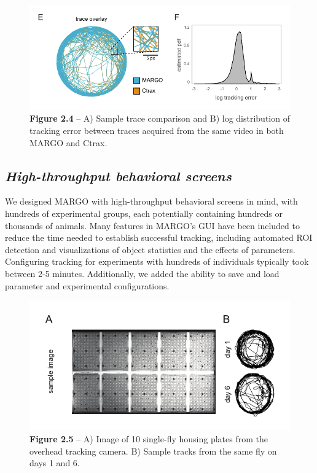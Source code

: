 \documentclass[12pt,letterpaper]{article}
\begin{document}
\begin{figure}[t!]
 \includegraphics[width=\textwidth]{../figures/chapter_2/fig_2-4.pdf}
 \caption*{\textbf{Figure 2.4} -- A) Sample trace comparison and B) log distribution of tracking error between traces acquired from the same video in both MARGO and Ctrax.}
\end{figure}

\subsection*{\textit{High-throughput behavioral screens}}

We designed MARGO with high-throughput behavioral screens in mind, with hundreds of experimental groups, each potentially containing hundreds or thousands of animals. Many features in MARGO's GUI have been included to reduce the time needed to establish successful tracking, including automated ROI detection and visualizations of object statistics and the effects of parameters. Configuring tracking for experiments with hundreds of individuals typically took between 2-5 minutes. Additionally, we added the ability to save and load parameter and experimental configurations.

\begin{figure}[b!]
 \includegraphics[width=\textwidth]{../figures/chapter_2/fig_2-5.pdf}
 \vspace{.1in}
 \caption*{\textbf{Figure 2.5} -- A) Image of 10 single-fly housing plates from the overhead tracking camera. B) Sample tracks from the same fly on days 1 and 6.}
\end{figure}
\end{document}
